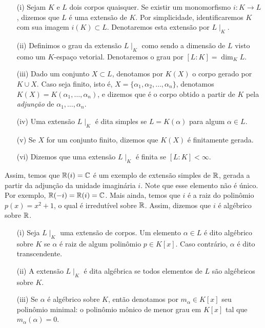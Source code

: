 \begin{defn}\begin{itemize}
\item[(i)] Sejam $K$ e $L$ dois corpos quaisquer. Se existir um monomorfismo $i: K \rightarrow L$, dizemos que $L$ é uma extensão de $K$. Por simplicidade, identificaremos $K$ com sua imagem $i(K) \subset L$. Denotaremos esta extensão por $L\mid_K$.
\item[(ii)] Definimos o grau da extensão $L\mid_K$ como sendo a dimensão de $L$ visto como um $K$-espaço vetorial. Denotaremos o grau por $[L:K]=\dim_K L$. 
\item[(iii)] Dado um conjunto $X \subset L$, denotamos por $K(X)$ o corpo gerado por $K \cup X$. Caso seja finito, isto é, $X = \{\alpha_1, \alpha_2, \dots, \alpha_n\}$, denotamos $K(X)=K(\alpha_1, \dots, \alpha_n)$, e dizemos que é o corpo obtido a partir de $K$ pela \emph{adjunção} de $\alpha_1, \dots, \alpha_n$. 
\item[(iv)]Uma extensão $L\mid_K$ é dita simples se $L=K(\alpha)$ para algum $\alpha \in L$. 
\item[(v)] Se $X$ for um conjunto finito, dizemos que $K(X)$ é finitamente gerada. 
\item[(vi)] Dizemos que uma extensão $L\mid_K$ é finita se $[L:K]<\infty$.\end{itemize}
\end{defn}%
Assim, temos que $\mathbb{R}(i)= \mathbb{C}$ é um exemplo de extensão simples de $\mathbb{R}$, gerada a partir da adjunção da unidade imaginária $i$. Note que esse elemento não é único. Por exemplo, $\mathbb{R}(-i) = \mathbb{R}(i)= \mathbb{C}$. Mais ainda, temos que $i$ é a raiz do polinômio $p(x)=x^2+1$, o qual é irredutível sobre $\mathbb{R}$. Assim, dizemos que $i$ é algébrico sobre $\mathbb{R}$.
\begin{defn}\begin{itemize}
\item[(i)] Seja $L\mid_K$ uma extensão de corpos. Um elemento $\alpha \in L$ é dito algébrico sobre $K$ se $\alpha$ é raiz de algum polinômio $p \in K[x]$. Caso contrário, $\alpha$ é dito transcendente. 
\item[(ii)] A extensão $L\mid_K$ é dita algébrica se todos elementos de $L$ são algébricos sobre $K$. 
\item[(iii)] Se $\alpha$ é algébrico sobre $K$, então denotamos por $m_\alpha \in K[x]$ seu polinômio minimal: o polinômio mônico de menor grau em $K[x]$ tal que $m_\alpha (\alpha)=0$.\end{itemize}
\end{defn}

